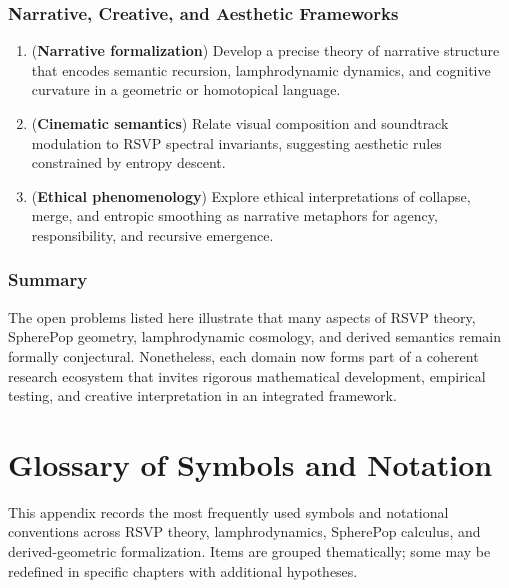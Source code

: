 \documentclass[12pt]{article}
\theoremstyle{plain}
\theoremstyle{definition}
\theoremstyle{remark}
\begin{document}
\section{Narrative, Creative, and Aesthetic Frameworks}

\begin{enumerate}
    \item ({\bf Narrative formalization})
    Develop a precise theory of narrative structure that encodes semantic
    recursion, lamphrodynamic dynamics, and cognitive curvature in a geometric
    or homotopical language.

    \item ({\bf Cinematic semantics})
    Relate visual composition and soundtrack modulation to RSVP spectral
    invariants, suggesting aesthetic rules constrained by entropy descent.

    \item ({\bf Ethical phenomenology})
    Explore ethical interpretations of collapse, merge, and entropic smoothing
    as narrative metaphors for agency, responsibility, and recursive emergence.
\end{enumerate}


\section*{Summary}

The open problems listed here illustrate that many aspects of RSVP theory,
SpherePop geometry, lamphrodynamic cosmology, and derived semantics remain
formally conjectural. Nonetheless, each domain now forms part of a coherent
research ecosystem that invites rigorous mathematical development, empirical
testing, and creative interpretation in an integrated framework.

\newpage

\appendix
\part{Glossary of Symbols and Notation}

This appendix records the most frequently used symbols and notational
conventions across RSVP theory, lamphrodynamics, SpherePop calculus, and
derived-geometric formalization. Items are grouped thematically; some may be
redefined in specific chapters with additional hypotheses.
\end{document}
